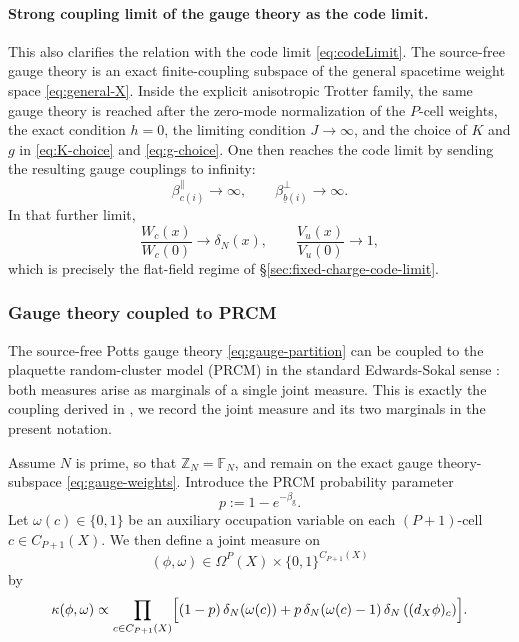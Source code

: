 \paragraph{Strong coupling limit of the gauge theory as the code limit.}
This also clarifies the relation with the code limit
\eqref{eq:codeLimit}. The source-free gauge theory is an exact finite-coupling
subspace of the general spacetime weight space \eqref{eq:general-X}. Inside
the explicit anisotropic Trotter family, the same gauge theory is reached after
the zero-mode normalization of the \(P\)-cell weights, the exact condition
\(h=0\), the limiting condition \(J\to\infty\), and the choice of \(K\) and
\(g\) in \eqref{eq:K-choice} and \eqref{eq:g-choice}. One then reaches the
code limit by sending the resulting gauge couplings to infinity:
\begin{equation}
	\beta_{c(i)}^{\parallel}\to\infty,
	\qquad
	\beta_{\underline b(i)}^{\perp}\to\infty.
\end{equation}
In that further limit,
\begin{equation}
	\frac{W_c(x)}{W_c(0)}\to \delta_N(x),
	\qquad
	\frac{V_u(x)}{V_u(0)}\to 1,
\end{equation}
which is precisely the flat-field regime of
\S\ref{sec:fixed-charge-code-limit}. %


\subsubsection{Gauge theory coupled to PRCM}
The source-free Potts gauge theory \eqref{eq:gauge-partition} can be coupled to
the plaquette random-cluster model (PRCM) in the standard Edwards-Sokal sense \cite{EdwardsSokal1988}: both
measures arise as marginals of a single joint measure. This is exactly the coupling derived in
\cite[Prop.~20]{DuncanSchweinhartTopological}, we record the joint measure
and its two marginals in the present notation.

Assume \(N\) is prime, so that \(\mathbb Z_N=\mathbb F_N\), and remain on the
exact gauge theory-subspace \eqref{eq:gauge-weights}. Introduce the PRCM probability parameter
\begin{equation}
	p:=1-e^{-\beta_{\mathrm g}}.
	\label{eq:p-from-beta}
\end{equation}
Let \(\omega(c)\in\{0,1\}\) be an auxiliary occupation variable on each
\((P+1)\)-cell \(c\in C_{P+1}(X)\). We then define a joint measure on
\begin{equation}
	(\phi,\omega)\in \Omega^P(X)\times \{0,1\}^{C_{P+1}(X)}
\end{equation}
by
\begin{equation}
	\kappa(\phi,\omega)
	\propto
	\prod_{c\in C_{P+1}(X)}
	\Bigl[
	(1-p)\,\delta_N(\omega(c))
	+
	p\,\delta_N(\omega(c)-1)\,\delta_N\left((d_X\phi)_c\right)
	\Bigr].
	\label{eq:joint-gauge-prcm}
\end{equation}

